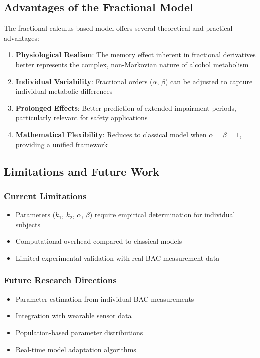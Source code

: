 \documentclass[11pt]{article}
\begin{document}
\subsection{Advantages of the Fractional Model}

The fractional calculus-based model offers several theoretical and practical advantages:

\begin{enumerate}
    \item \textbf{Physiological Realism}: The memory effect inherent in fractional derivatives better represents the complex, non-Markovian nature of alcohol metabolism
    
    \item \textbf{Individual Variability}: Fractional orders ($\alpha$, $\beta$) can be adjusted to capture individual metabolic differences
    
    \item \textbf{Prolonged Effects}: Better prediction of extended impairment periods, particularly relevant for safety applications
    
    \item \textbf{Mathematical Flexibility}: Reduces to classical model when $\alpha = \beta = 1$, providing a unified framework
\end{enumerate}

\subsection{Limitations and Future Work}

\subsubsection{Current Limitations}
\begin{itemize}
    \item Parameters ($k_1$, $k_2$, $\alpha$, $\beta$) require empirical determination for individual subjects
    \item Computational overhead compared to classical models
    \item Limited experimental validation with real BAC measurement data
\end{itemize}

\subsubsection{Future Research Directions}
\begin{itemize}
    \item Parameter estimation from individual BAC measurements
    \item Integration with wearable sensor data
    \item Population-based parameter distributions
    \item Real-time model adaptation algorithms
\end{itemize}
\end{document}
